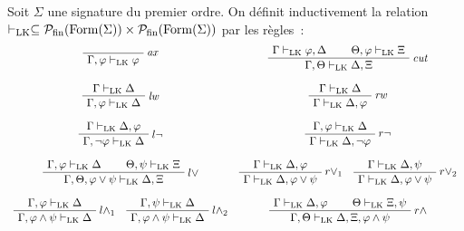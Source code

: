 \begin{definition}
  Soit $\Sigma$ une signature du premier ordre. On définit inductivement
  la relation
  $\vdash_{\operatorname{LK}}\subseteq \mathcal{P}_{\mathrm{fin}}(\operatorname{Form}(\Sigma))\times\mathcal{P}_{\mathrm{fin}}(\operatorname{Form}(\Sigma))$
  par les règles~:
  \[\begin{array}{cc}
  \AxiomC{}
  \RightLabel{\textit{ax}}
  \UnaryInfC{$\Gamma, \varphi\vdLK \varphi$}
  \DisplayProof
  &
  \AxiomC{$\Gamma \vdLK \varphi,\Delta$}
  \AxiomC{$\Theta, \varphi \vdLK \Xi$}
  \RightLabel{\textit{cut}}
  \BinaryInfC{$\Gamma, \Theta\vdLK \Delta, \Xi$}
  \DisplayProof
  \\
  \\
  \AxiomC{$\Gamma \vdLK \Delta$}
  \RightLabel{\textit{lw}}
  \UnaryInfC{$\Gamma, \varphi \vdLK \Delta$}
  \DisplayProof
  &
  \AxiomC{$\Gamma \vdLK \Delta$}
  \RightLabel{\textit{rw}}
  \UnaryInfC{$\Gamma\vdLK \Delta, \varphi$}
  \DisplayProof
  \\
  \\
  \AxiomC{$\Gamma\vdLK \Delta, \varphi$}
  \RightLabel{$l\lnot$}
  \UnaryInfC{$\Gamma, \lnot\varphi \vdLK \Delta$}
  \DisplayProof
  &
  \AxiomC{$\Gamma, \varphi\vdLK \Delta$}
  \RightLabel{$r\lnot$}
  \UnaryInfC{$\Gamma\vdLK \Delta, \lnot\varphi$}
  \DisplayProof
  \\
  \\
  \AxiomC{$\Gamma, \varphi \vdLK \Delta$}
  \AxiomC{$\Theta, \psi \vdLK \Xi$}
  \RightLabel{$l\lor$}
  \BinaryInfC{$\Gamma, \Theta, \varphi\lor\psi \vdLK \Delta, \Xi$}
  \DisplayProof
  &
  \AxiomC{$\Gamma \vdLK \Delta,\varphi$}
  \RightLabel{$r\lor_1$}
  \UnaryInfC{$\Gamma\vdLK \Delta,\varphi\lor\psi$}
  \DisplayProof
  \quad
  \AxiomC{$\Gamma\vdLK \Delta,\psi$}
  \RightLabel{$r\lor_2$}
  \UnaryInfC{$\Gamma\vdLK \Delta, \varphi \lor \psi$}
  \DisplayProof
  \\
  \\
  \AxiomC{$\Gamma, \varphi \vdLK \Delta$}
  \RightLabel{$l\land_1$}
  \UnaryInfC{$\Gamma,\varphi\land\psi\vdLK \Delta$}
  \DisplayProof
  \quad
  \AxiomC{$\Gamma, \psi \vdLK \Delta$}
  \RightLabel{$l\land_2$}
  \UnaryInfC{$\Gamma,\varphi \land \psi\vdLK \Delta$}
  \DisplayProof
  &
  \AxiomC{$\Gamma\vdLK \Delta,\varphi$}
  \AxiomC{$\Theta\vdLK \Xi,\psi$}
  \RightLabel{$r\land$}
  \BinaryInfC{$\Gamma, \Theta\vdLK \Delta, \Xi, \varphi\land\psi$}
  \DisplayProof
  \\
  \\
  \AxiomC{$\Gamma \vdLK \Delta,\varphi$}
  \AxiomC{$\Theta, \psi \vdLK \Xi$}
  \RightLabel{$l\to$}
  \BinaryInfC{$\Gamma, \Theta,\varphi\to\psi\vdLK \Delta, \Xi$}

\end{array}\]
\end{definition}
